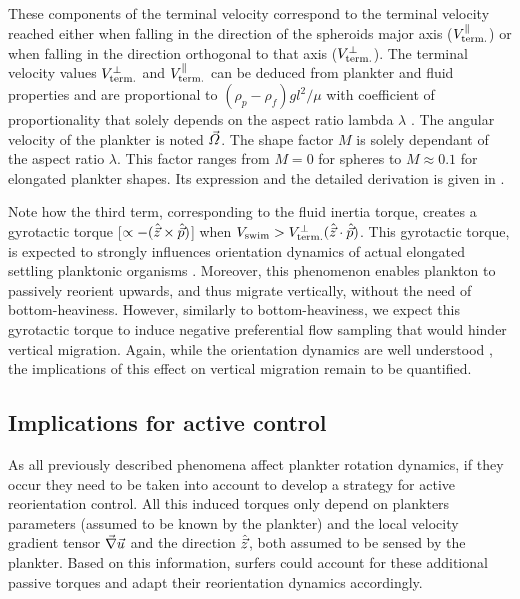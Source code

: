 These components of the terminal velocity correspond to the terminal velocity reached either when falling in the direction of the spheroids major axis ($V_{\mathrm{term.}}^\parallel$) or when falling in the direction orthogonal to that axis ($V_{\mathrm{term.}}^\perp$). 
The terminal velocity values $V_{\mathrm{term.}}^\perp$ and $V_{\mathrm{term.}}^\parallel$ can be deduced from plankter and fluid properties and are proportional to $(\rho_p - \rho_f) g l^2 / \mu$ with coefficient of proportionality that solely depends on the aspect ratio lambda $\lambda$ \citep{dahlkild2011finite, ardekani2017sedimentation, gustavsson2019effect}.
The angular velocity of the plankter is noted $\vec{\varOmega}$. 
The shape factor $M$ is solely dependant of the aspect ratio $\lambda$.
This factor ranges from $M = 0$ for spheres to $M \approx 0.1$ for elongated plankter shapes. 
Its expression and the detailed derivation is given in \citet{qiu2022gyrotactic}.

Note how the third term, corresponding to the fluid inertia torque, creates a gyrotactic torque [$\propto - (\hat{\vec{z}} \times \hat{\vec{p}})$] when $V_{\mathrm{swim}} > V_{\mathrm{term.}}^\perp (\hat{\vec{z}} \cdot \hat{\vec{p}})$.
This gyrotactic torque, is expected to strongly influences orientation dynamics of actual elongated settling planktonic organisms \citep{qiu2022gyrotactic}.
Moreover, this phenomenon enables plankton to passively reorient upwards, and thus migrate vertically, without the need of bottom-heaviness.
However, similarly to bottom-heaviness, we expect this gyrotactic torque to induce negative preferential flow sampling that would hinder vertical migration.
Again, while the orientation dynamics are well understood \citep{qiu2022gyrotactic}, the implications of this effect on vertical migration remain to be quantified. 

\subsection{Implications for active control}

As all previously described phenomena affect plankter rotation dynamics, if they occur they need to be taken into account to develop a strategy for active reorientation control.
All this induced torques only depend on plankters parameters (assumed to be known by the plankter) and the local velocity gradient tensor $\vec{\nabla} \vec{u}$ and the direction $\hat{\vec{z}}$, both assumed to be sensed by the plankter.
Based on this information, surfers could account for these additional passive torques and adapt their reorientation dynamics accordingly.

